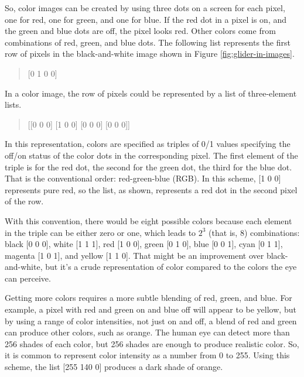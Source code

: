 So, color images can be created by using three dots on a screen
for each pixel,
one for red, one for green, and one for blue.
If the red dot in a pixel is on, and the green and blue dots
are off, the pixel looks red. Other colors come from combinations
of red, green, and blue dots.
The following list represents the first row of pixels
in the black-and-white image shown in
Figure \ref{fig:glider-in-images}.
\begin{quote}
    \textsf{[0 1 0 0]}
\end{quote}
In a color image, the row of pixels could be represented by
a list of three-element lists.
\begin{quote}
    \textsf{[[0 0 0] [1 0 0] [0 0 0] [0 0 0]]}
\end{quote}
In this representation, colors are specified as triples of 0/1 values
specifying the off/on status of the color dots in the corresponding pixel.
The first element of the triple is for the red dot, the second
for the green dot, the third for the blue dot.
That is the conventional order:
red-green-blue (RGB).
In this scheme, \textsf{[1 0 0]} represents pure red,
so the list, as shown, represents a red dot in the second pixel of the row.

With this convention, there would be eight possible colors because
each element in the triple can be either zero or one,
which leads to $2^3$ (that is, $8$) combinations:
black \textsf{[0 0 0]},
white \textsf{[1 1 1]},
red \textsf{[1 0 0]},
green \textsf{[0 1 0]},
blue \textsf{[0 0 1]},
cyan \textsf{[0 1 1]},
magenta \textsf{[1 0 1]},
and
yellow \textsf{[1 1 0]}.
That might be an improvement over black-and-white,
but it's a crude representation of color
compared to the colors the eye can perceive.

Getting more colors requires a more subtle blending of
red, green, and blue. For example, a pixel with red and green
on and blue off will appear to be yellow,
but by using a range of color intensities,
not just on and off, a blend of red and green can produce other
colors, such as orange. The human eye can detect more than 256 shades of
each color, but 256 shades are enough to produce realistic color.
So, it is common to represent color intensity as a number
from 0 to 255. Using this scheme, the list \textsf{[255 140 0]} produces
a dark shade of orange.

